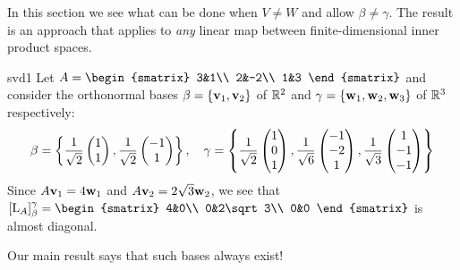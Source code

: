 In this section we see what can be done when $V\neq W$ and allow $\beta\neq\gamma$. The result is an approach that applies to \emph{any} linear map between finite-dimensional inner product spaces.

\begin{example}{}{svd1}
	Let $A=
	\smash[b]{\begin{smatrix}
		3&1\\
		2&-2\\
		1&3
	\end{smatrix}}$
	and consider the orthonormal bases $\beta=\{{\mathbf{v}}_1,{\mathbf{v}}_2\}$ of $\mathbb{R}^2$ and $\gamma=\{{\mathbf{w}}_1,{\mathbf{w}}_2,{\mathbf{w}}_3\}$ of $\mathbb{R}^3$ respectively:
	\[
		\beta
		=\left\{\frac 1{\sqrt 2}\begin{pmatrix}1\\1\end{pmatrix},\frac 1{\sqrt 2}\begin{pmatrix}-1\\1\end{pmatrix}\right\},\quad 
		\gamma
		=\left\{\frac 1{\sqrt 2}\begin{pmatrix}1\\0\\1\end{pmatrix},\frac 1{\sqrt 6}\begin{pmatrix}-1\\-2\\1\end{pmatrix}, \frac 1{\sqrt 3}\begin{pmatrix}1\\-1\\-1\end{pmatrix}\right\}
	\]
	Since $A{\mathbf{v}}_1=4{\mathbf{w}}_1$ and $A{\mathbf{v}}_2=2\sqrt 3{\mathbf{w}}_2$, we see that $\smash[b]{[\rL_A]_\beta^\gamma=
	\begin{smatrix}
		4&0\\
		0&2\sqrt 3\\
		0&0
	\end{smatrix}}$
	is almost diagonal.
\end{example}

Our main result says that such bases always exist!


